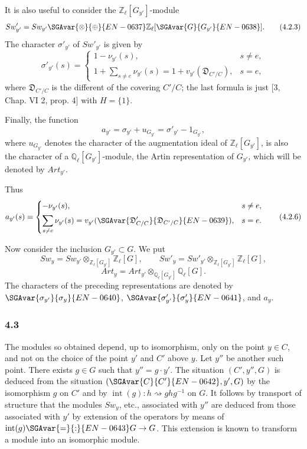 It is also useful to consider the $\mathbb Z_\ell[G_{y'}]$-module
\[
Sw'_{y'}=Sw_{y'}\SGAvar{\otimes}{\oplus}{EN-0637}\mathbb Z_\ell[\SGAvar{G}{G_{y'}}{EN-0638}].
\tag{4.2.3}
\]
The character $\sigma'_{y'}$ of $Sw'_{y'}$ is given by
\[
\sigma'_{y'}(s)=
\begin{cases}
1-\nu_{y'}(s),& s\ne e,\\[0.4em]
\displaystyle 1+\sum_{s\ne e}\nu_{y'}(s)
=1+v_{y'}(\mathfrak D_{C'/C}),& s=e,
\end{cases}
\tag{4.2.4}
\]
where $\mathfrak D_{C'/C}$ is the different of the covering $C'/C$; the last formula is just [3, Chap. VI 2, prop. 4] with $H=\{1\}$.

Finally, the function
\[
a_{y'}=\sigma_{y'}+u_{G_{y'}}=\sigma'_{y'}-1_{G_{y'}},
\tag{4.2.5}
\]
where $u_{G_{y'}}$ denotes the character of the augmentation ideal of $\mathbb Z_\ell[G_{y'}]$, is also the character of a $\mathbb Q_\ell[G_{y'}]$-module, the Artin representation of $G_{y'}$, which will be denoted by $Art_{y'}$.

Thus
\[
a_{y'}(s)=
\begin{cases}
-\nu_{y'}(s),& s\ne e,\\[0.4em]
\displaystyle\sum_{s\ne e}\nu_{y'}(s)=v_{y'}(\SGAvar{\mathfrak D_{C/C}'}{\mathfrak D_{C'/C}}{EN-0639}),& s=e.
\end{cases}
\tag{4.2.6}
\]

Now consider the inclusion $G_{y'}\subset G$. We put
\[
Sw_y=Sw_{y'}\otimes_{\mathbb Z_\ell[G_{y'}]}\mathbb Z_\ell[G],
\qquad
Sw'_y=Sw'_{y'}\otimes_{\mathbb Z_\ell[G_{y'}]}\mathbb Z_\ell[G],
\tag{4.2.7}
\]
\[
Art_y=Art_{y'}\otimes_{\mathbb Q_\ell[G_{y'}]}\mathbb Q_\ell[G].
\tag{4.2.8}
\]
The characters of the preceding representations are denoted by $\SGAvar{\sigma_{y'}}{\sigma_y}{EN-0640}$, $\SGAvar{\sigma'_{y'}}{\sigma'_y}{EN-0641}$, and $a_y$.

\subsubsection*{4.3}

The modules so obtained depend, up to isomorphism, only on the point $y\in C$, and not on the choice of the point $y'$ and $C'$ above $y$. Let $y''$ be another such point. There exists $g\in G$ such that $y''=g\cdot y'$. The situation $(C',y'',G)$ is deduced from the situation $(\SGAvar{C}{C'}{EN-0642},y',G)$ by the isomorphism $g$ on $C'$ and by $\operatorname{int}(g):h\rightsquigarrow ghg^{-1}$ on $G$. It follows by transport of structure that the modules $Sw_y$, etc., associated with $y''$ are deduced from those associated with $y'$ by extension of the operators by means of $\operatorname{int}(g)\SGAvar{=}{:}{EN-0643}G\to G$. This extension is known to transform a module into an isomorphic module.

